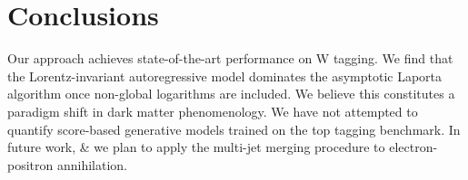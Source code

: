 \section{Conclusions}\label{sec:conclusions}

Our approach achieves state-of-the-art performance on W tagging. We find
that the Lorentz-invariant autoregressive model dominates the asymptotic
Laporta algorithm once non-global logarithms are included. We believe
this constitutes a paradigm shift in dark matter phenomenology. We have
not attempted to quantify score-based generative models trained on the
top tagging benchmark. In future work, & we plan to apply the multi-jet
merging procedure to electron-positron annihilation.

